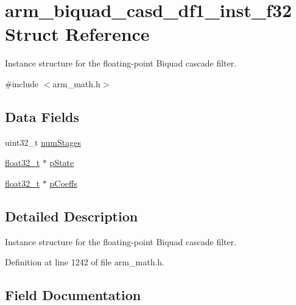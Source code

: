 \hypertarget{structarm__biquad__casd__df1__inst__f32}{}\section{arm\+\_\+biquad\+\_\+casd\+\_\+df1\+\_\+inst\+\_\+f32 Struct Reference}
\label{structarm__biquad__casd__df1__inst__f32}


Instance structure for the floating-\/point Biquad cascade filter.  




{\ttfamily \#include $<$arm\+\_\+math.\+h$>$}

\subsection*{Data Fields}
\begin{DoxyCompactItemize}
\item 
uint32\+\_\+t \hyperlink{structarm__biquad__casd__df1__inst__f32_aed9c8a6224cd149e8e12b17b25b9b767}{num\+Stages}
\item 
\hyperlink{arm__math_8h_a4611b605e45ab401f02cab15c5e38715}{float32\+\_\+t} $\ast$ \hyperlink{structarm__biquad__casd__df1__inst__f32_a335c87e6fdc4b96601d95a5de8b9c463}{p\+State}
\item 
\hyperlink{arm__math_8h_a4611b605e45ab401f02cab15c5e38715}{float32\+\_\+t} $\ast$ \hyperlink{structarm__biquad__casd__df1__inst__f32_aacbb8dd8eeba4b21fc2bb40076405ee3}{p\+Coeffs}
\end{DoxyCompactItemize}


\subsection{Detailed Description}
Instance structure for the floating-\/point Biquad cascade filter. 

Definition at line 1242 of file arm\+\_\+math.\+h.



\subsection{Field Documentation}
